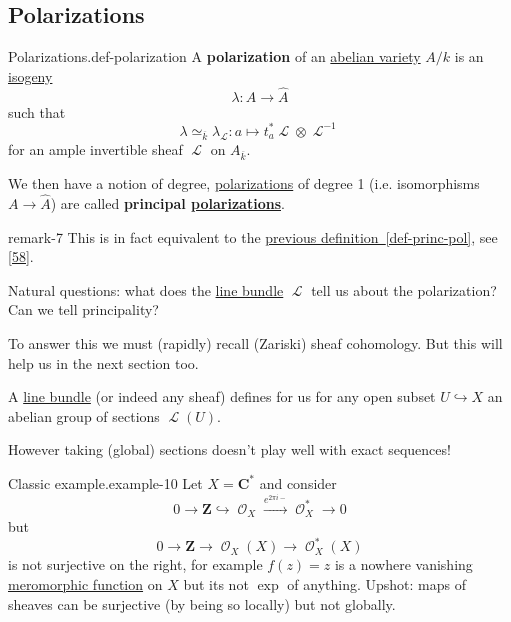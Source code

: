\documentclass[10pt,]{book}
\newcommand{\terminology}[1]{\textbf{#1}}
\numberwithin{equation}{section}
\newcommand{\sheaf}[1]{\operatorname{\mathcal{#1}}}
\newcommand{\ZZ}{\mathbf{Z}}
\newcommand{\CC}{\mathbf{C}}
\begin{document}
\subsection[{Polarizations}]{Polarizations}\label{subsection-25}
\begin{definition}{Polarizations.}{def-polarization}%
\hypertarget{p-244}{}%
A \terminology{polarization} of an \hyperref[def-buntes-abvar]{abelian variety} \(A/k\) is an \hyperref[def-supersing-isog-isog]{isogeny}%
\begin{equation*}
\lambda \colon A \to \hat A
\end{equation*}
such that%
\begin{equation*}
\lambda \simeq_{\overline k} \lambda_{\sheaf{L}} : a\mapsto t_a^*\sheaf L \otimes \sheaf L^{-1}
\end{equation*}
for an ample invertible sheaf \(\sheaf L\) on \(A_{\overline k}\).%
\par
\hypertarget{p-245}{}%
We then have a notion of degree, \hyperref[def-polarization]{polarizations} of degree 1 (i.e. isomorphisms \(A\to \hat A\)) are called \terminology{principal \hyperref[def-polarization]{polarizations}}.%
\end{definition}
\begin{remark}{}{remark-7}%
\hypertarget{p-246}{}%
This is in fact equivalent to the \hyperref[def-princ-pol]{previous definition~\ref{def-princ-pol}}, see \hyperlink{bib-vandergeer-moonen}{[58]}.%
\end{remark}
\hypertarget{p-247}{}%
Natural questions: what does the \hyperref[def-line-bundle]{line bundle} \(\sheaf L\) tell us about the polarization? Can we tell principality?%
\par
\hypertarget{p-248}{}%
To answer this we must (rapidly) recall (Zariski) sheaf cohomology. But this will help us in the next section too.%
\par
\hypertarget{p-249}{}%
A \hyperref[def-line-bundle]{line bundle} (or indeed any sheaf) defines for us for any open subset \(U \hookrightarrow X\) an abelian group of sections \(\sheaf L(U)\).%
\par
\hypertarget{p-250}{}%
However taking (global) sections doesn't play well with exact sequences!%
\begin{example}{Classic example.}{example-10}%
\hypertarget{p-251}{}%
Let \(X = \CC^*\) and consider%
\begin{equation*}
0 \to \ZZ \hookrightarrow \sheaf O_X \xrightarrow{e^{2\pi i -}} \sheaf O_X^* \to 0
\end{equation*}
but%
\begin{equation*}
0 \to \ZZ \to \sheaf O_X(X) \to \sheaf O_X^*(X)
\end{equation*}
is not surjective on the right, for example \(f(z) = z\) is a nowhere vanishing \hyperref[def-morph-riem-surf]{meromorphic function} on \(X\) but its not \(\exp\) of anything. Upshot: maps of sheaves can be surjective (by being so locally) but not globally.%
\end{example}
\end{document}
